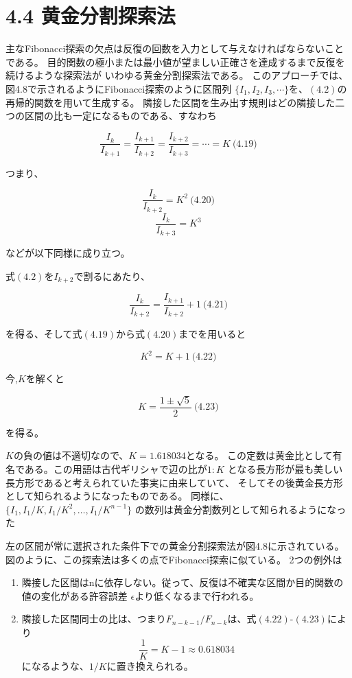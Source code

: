 \section*{4.4 黄金分割探索法}\label{4-4-}

主なFibonacci探索の欠点は反復の回数を入力として与えなければならないことである。
目的関数の極小または最小値が望ましい正確さを達成するまで反復を続けるような探索法が
いわゆる黄金分割探索法である。
このアプローチでは、図4.8で示されるようにFibonacci探索のように区間列
$\lbrace I_1, I_2, I_3 ,
\cdots \rbrace$を、$(4.2)$の再帰的関数を用いて生成する。
隣接した区間を生み出す規則はどの隣接した二つの区間の比も一定になるものである、すなわち

$$\frac{I_k}{I_{k+1}} =
\frac{I_{k+1}}{I_{k+2}} =
\frac{I_{k+2}}{I_{k+3}} = \cdots
= K \ \text{(4.19)}$$

つまり、

$$ \frac{I_k}{I_{k+2}} = K^2
\ \text{(4.20)} $$
$$
\frac{I_k}{I_{k+3}} = K^3 $$

などが以下同様に成り立つ。

式$(4.2)$を$I_{k+2}$で割るにあたり、

$$\frac{I_k}{I_{k+2}} =
\frac{I_{k+1}}{I_{k+2}} + 1 \
\text{(4.21)}$$

を得る、そして式$(4.19)$から式$(4.20)$までを用いると

$$K^2 = K + 1 \ \text{(4.22)}$$

今,$K$を解くと

$$K = \frac{1 \pm
\sqrt{5}}{2} \
\text{(4.23)}$$

を得る。

$K$の負の値は不適切なので、$K = 1.618034$となる。
この定数は黄金比として有名である。この用語は古代ギリシャで辺の比が$1 :
K$
となる長方形が最も美しい長方形であると考えられていた事実に由来していて、
そしてその後黄金長方形として知られるようになったものである。
同様に、$\lbrace I_1, I_1/K , I_1 / K^2 ,
\dots , I_1 / K^{n-1} \rbrace$
の数列は黄金分割数列として知られるようになった
\newpage

左の区間が常に選択された条件下での黄金分割探索法が図4.8に示されている。
図のように、この探索法は多くの点でFibonacci探索に似ている。 2つの例外は

\begin{enumerate}
\tightlist
\item
  隣接した区間はnに依存しない。従って、反復は不確実な区間か目的関数の値の変化がある許容誤差
  $\epsilon$より低くなるまで行われる。
\item
  隣接した区間同士の比は、つまり$F_{n-k-1} /
  F_{n-k}$は、式$(4.22)$-$(4.23)$により
  $$\frac{1}{K} = K - 1 \approx 0.618034$$
  になるような、$1/K$に置き換えられる。
\end{enumerate}

